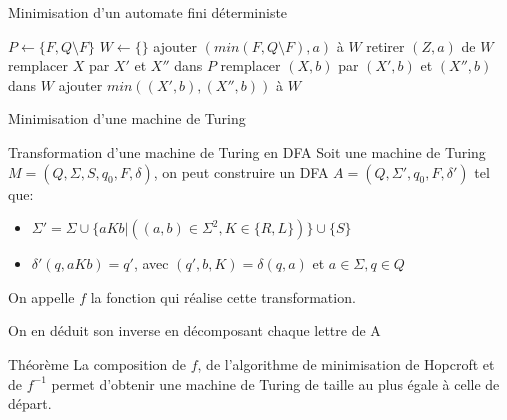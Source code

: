 \documentclass{beamer}
\begin{document}
    \begin{frame}{Minimisation d'un automate fini déterministe}
            \begin{algorithm}[H]
                \tiny
                \caption{Algorithme de Hopcroft, $A = (Q, \Sigma, q_0, F, \delta)$ un automate fini déterministe}
                \begin{algorithmic}[1]
                    \STATE $P \gets \{F, Q \setminus F\}$
                    \STATE $W \gets \{\}$
                        \STATE ajouter $(min(F, Q \setminus F), a)$ à $W$
                    \ENDFOR
                        \STATE retirer $(Z, a)$ de $W$
                            \STATE remplacer $X$ par $X'$ et $X''$ dans $P$
                                    \STATE remplacer $(X, b)$ par $(X', b)$ et $(X'', b)$ dans $W$
                                \ELSE
                                    \STATE ajouter  $min((X', b),(X'', b))$ à $W$
                                \ENDIF
                            \ENDFOR
                        \ENDFOR
                    \ENDWHILE
                \end{algorithmic}
            \end{algorithm}
    \end{frame}
    \begin{frame}{Minimisation d'une machine de Turing}
        \begin{alert}{Transformation d'une machine de Turing en DFA}
            Soit une machine de Turing $M = (Q, \Sigma, S, q_0, F, \delta)$, on
            peut construire un DFA $A = (Q, \Sigma', q_0, F, \delta')$ tel que:
            \begin{itemize}
                \item $\Sigma' = \Sigma \cup \{aKb | ((a,b)\in\Sigma^2, K\in\{R,L\})\} \cup \{S\}$
                \item $\delta'(q, aKb) = q'$, avec $(q', b, K) = \delta(q, a)$ et $a \in \Sigma, q \in Q$

            \end{itemize}
            On appelle $f$ la fonction qui réalise cette transformation.

            On en déduit son inverse en décomposant chaque lettre de A
        \end{alert}
        \begin{block}{Théorème}
            La composition de $f$, de l'algorithme de minimisation de Hopcroft 
            et de $f^{-1}$ permet d'obtenir une machine de Turing de taille au plus égale à celle de
            départ.
        \end{block}
    \end{frame}
\end{document}

